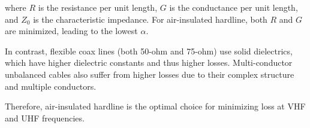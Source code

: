 where \(R\) is the resistance per unit length, \(G\) is the conductance per unit length, and \(Z_0\) is the characteristic impedance. For air-insulated hardline, both \(R\) and \(G\) are minimized, leading to the lowest \(\alpha\).

In contrast, flexible coax lines (both 50-ohm and 75-ohm) use solid dielectrics, which have higher dielectric constants and thus higher losses. Multi-conductor unbalanced cables also suffer from higher losses due to their complex structure and multiple conductors.

Therefore, air-insulated hardline is the optimal choice for minimizing loss at VHF and UHF frequencies.

